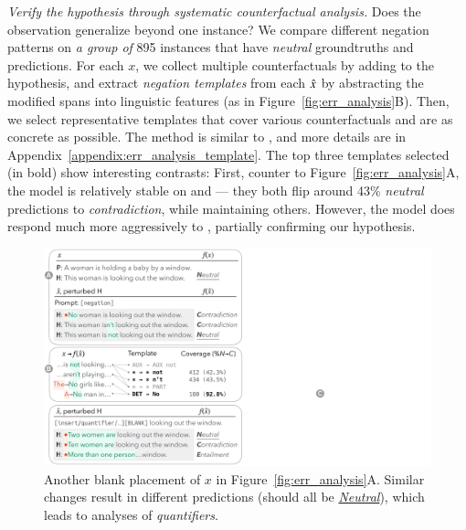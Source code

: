 \emph{Verify the hypothesis through systematic counterfactual analysis.}
Does the observation generalize beyond one instance? 
We compare different negation patterns on \emph{a group of} 895 instances that have \emph{neutral} groundtruths and predictions.
For each $x$, we collect multiple counterfactuals by adding  to the hypothesis, and extract \emph{negation templates} from each $\hat{x}$ by abstracting the modified spans into linguistic features (as in Figure~\ref{fig:err_analysis}B).
Then, we select representative templates that cover various counterfactuals and are as concrete as possible. 
The method is similar to \citet{wu2020tempura}, and more details are in Appendix~\ref{appendix:err_analysis_template}.
The top three templates selected (in bold) show interesting contrasts:
First, counter to Figure~\ref{fig:err_analysis}A, the model is relatively stable on  and  --- they both flip around 43\% \emph{neutral} predictions to \emph{contradiction}, while maintaining others.
However, the model does respond much more aggressively to , partially confirming our hypothesis.

\begin{figure}[t]
\centering
\includegraphics[trim={0.5cm 1.8cm 32.5cm 25.5cm},clip,width=1\columnwidth]{figures/err_analysis.pdf}
\vspace{-15pt}
\caption{
Another blank placement of $x$ in Figure~\ref{fig:err_analysis}A. 
Similar changes result in different predictions (should all be \uline{\emph{Neutral}}), which leads to analyses of \emph{quantifiers}.
}
\vspace{-10pt}
\label{fig:err_analysis_quantifier}
\end{figure}


